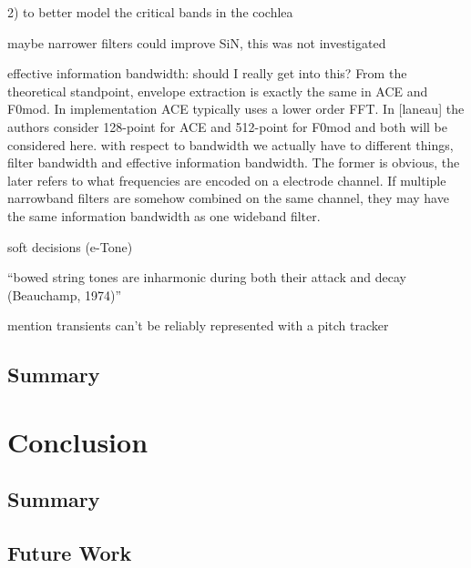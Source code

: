 \documentclass [11pt, proquest,oneside] {ganter_thesis}[2015/03/03]
\begin{document}
2) to better model the critical bands in the cochlea

maybe narrower filters could improve SiN, this was not investigated

effective information bandwidth: should I really get into this?
From the theoretical standpoint, envelope extraction is exactly the same in ACE and F0mod.  In implementation ACE typically uses a lower order FFT.  In [laneau] the authors consider 128-point for ACE and 512-point for F0mod and both will be considered here.
        with respect to bandwidth we actually have to different things, filter bandwidth and effective information bandwidth.  The former is obvious, the later refers to what frequencies are encoded on a electrode channel.  If multiple narrowband filters are somehow combined on the same channel, they may have the same information bandwidth as one wideband filter.
        
soft decisions (e-Tone)

``bowed string tones are inharmonic during both their attack and decay (Beauchamp, 1974)''

mention transients can't be reliably represented with a pitch tracker

\section{Summary}



\chapter{Conclusion}\label{ch:conclusion}

\section{Summary}

\section{Future Work}


%
%
\nocite{*}   %


%
%
\appendix
\raggedbottom\sloppy
 

\end{document}
